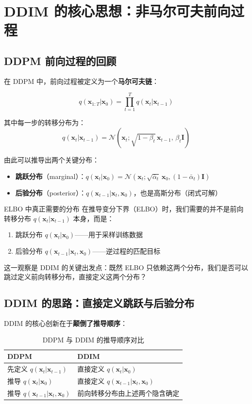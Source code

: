 \documentclass[a4paper]{article}
\begin{document}
\section{DDIM 的核心思想：非马尔可夫前向过程}

\subsection{DDPM 前向过程的回顾}

在 DDPM 中，前向过程被定义为一个\textbf{马尔可夫链}：

$$
q(\mathbf{x}_{1:T} | \mathbf{x}_0) = \prod_{t=1}^{T} q(\mathbf{x}_t | \mathbf{x}_{t-1})
$$

其中每一步的转移分布为：
$$
q(\mathbf{x}_t | \mathbf{x}_{t-1}) = \mathcal{N}(\mathbf{x}_t; \sqrt{1-\beta_t}\,\mathbf{x}_{t-1},\, \beta_t \mathbf{I})
$$

由此可以推导出两个关键分布：
\begin{itemize}
    \item \textbf{跳跃分布}（marginal）：$q(\mathbf{x}_t | \mathbf{x}_0) = \mathcal{N}(\mathbf{x}_t; \sqrt{\bar{\alpha}_t}\,\mathbf{x}_0, (1-\bar{\alpha}_t)\mathbf{I})$
    \item \textbf{后验分布}（posterior）：$q(\mathbf{x}_{t-1} | \mathbf{x}_t, \mathbf{x}_0)$，也是高斯分布（闭式可解）
\end{itemize}

\begin{importantbox}{ELBO 中真正需要的分布}
在推导变分下界（ELBO）时，我们需要的并不是前向转移分布 $q(\mathbf{x}_t|\mathbf{x}_{t-1})$ 本身，而是：
\begin{enumerate}
    \item 跳跃分布 $q(\mathbf{x}_t | \mathbf{x}_0)$——用于采样训练数据
    \item 后验分布 $q(\mathbf{x}_{t-1} | \mathbf{x}_t, \mathbf{x}_0)$——逆过程的匹配目标
\end{enumerate}
这一观察是 DDIM 的关键出发点：既然 ELBO 只依赖这两个分布，我们是否可以跳过定义前向转移分布，直接定义这两个分布？
\end{importantbox}

\subsection{DDIM 的思路：直接定义跳跃与后验分布}

DDIM 的核心创新在于\textbf{颠倒了推导顺序}：

\begin{table}[H]
\centering
\caption{DDPM 与 DDIM 的推导顺序对比}
\begin{tabular}{ll}
\toprule
\textbf{DDPM} & \textbf{DDIM} \\
\midrule
先定义 $q(\mathbf{x}_t|\mathbf{x}_{t-1})$ & 直接定义 $q(\mathbf{x}_t|\mathbf{x}_0)$ \\
推导 $q(\mathbf{x}_t|\mathbf{x}_0)$ & 直接定义 $q(\mathbf{x}_{t-1}|\mathbf{x}_t, \mathbf{x}_0)$ \\
推导 $q(\mathbf{x}_{t-1}|\mathbf{x}_t, \mathbf{x}_0)$ & 前向转移分布由上述两个隐含确定 \\
\bottomrule
\end{tabular}
\end{table}
\end{document}
